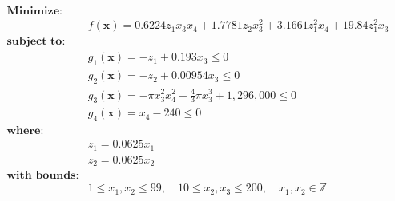 \begin{align*}
\textbf{Minimize:} \\
& f(\bm{x}) = 0.6224z_1x_3x_4 + 1.7781z_2x_3^2 + 3.1661z_1^2x_4 + 19.84z_1^2x_3 \\[0.5em]
\textbf{subject to:} &\\
& g_1(\bm{x}) = -z_1 + 0.193x_3 \leq 0 \\
& g_2(\bm{x}) = -z_2 + 0.00954x_3 \leq 0 \\
& g_3(\bm{x}) = -\pi x_3^2x_4^2 - \frac{4}{3} \pi x_3^3 + 1,296,000 \leq 0 \\
& g_4(\bm{x}) = x_4 - 240  \leq 0 \\[0.5em]
\textbf{where:} & \\
& z_1 = 0.0625x_1 \\
& z_2 = 0.0625x_2 \\[0.5em]
\textbf{with bounds:} & \\
& 1 \leq x_1, x_2 \leq 99, \quad 10 \leq x_2, x_3 \leq 200, \quad x_1, x_2 \in \mathbb{Z}
\end{align*}